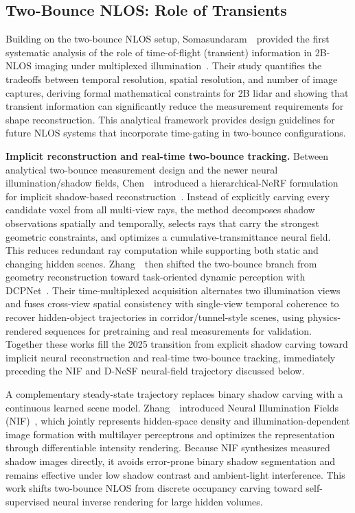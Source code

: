 \subsection{Two-Bounce NLOS: Role of Transients}
Building on the two-bounce NLOS setup, Somasundaram~\etal~provided the first systematic analysis of the role of time-of-flight (transient) information in 2B-NLOS imaging under multiplexed illumination~\cite{somasundaramRoleTransients2023}. Their study quantifies the tradeoffs between temporal resolution, spatial resolution, and number of image captures, deriving formal mathematical constraints for 2B lidar and showing that transient information can significantly reduce the measurement requirements for shape reconstruction. This analytical framework provides design guidelines for future NLOS systems that incorporate time-gating in two-bounce configurations.

\vspace{0.8mm}
\noindent \textbf{Implicit reconstruction and real-time two-bounce tracking.}
Between analytical two-bounce measurement design and the newer neural illumination/shadow fields, Chen~\etal~introduced a hierarchical-NeRF formulation for implicit shadow-based reconstruction~\cite{chenImplicitTwoBounceNLOS2025}. Instead of explicitly carving every candidate voxel from all multi-view rays, the method decomposes shadow observations spatially and temporally, selects rays that carry the strongest geometric constraints, and optimizes a cumulative-transmittance neural field. This reduces redundant ray computation while supporting both static and changing hidden scenes. Zhang~\etal~then shifted the two-bounce branch from geometry reconstruction toward task-oriented dynamic perception with DCPNet~\cite{zhangDCPNetTwoBounce2025}. Their time-multiplexed acquisition alternates two illumination views and fuses cross-view spatial consistency with single-view temporal coherence to recover hidden-object trajectories in corridor/tunnel-style scenes, using physics-rendered sequences for pretraining and real measurements for validation. Together these works fill the 2025 transition from explicit shadow carving toward implicit neural reconstruction and real-time two-bounce tracking, immediately preceding the NIF and D-NeSF neural-field trajectory discussed below.

A complementary steady-state trajectory replaces binary shadow carving with a continuous learned scene model. Zhang~\etal~introduced Neural Illumination Fields (NIF)~\cite{zhangNeuralIlluminationFields2026}, which jointly represents hidden-space density and illumination-dependent image formation with multilayer perceptrons and optimizes the representation through differentiable intensity rendering. Because NIF synthesizes measured shadow images directly, it avoids error-prone binary shadow segmentation and remains effective under low shadow contrast and ambient-light interference. This work shifts two-bounce NLOS from discrete occupancy carving toward self-supervised neural inverse rendering for large hidden volumes.

